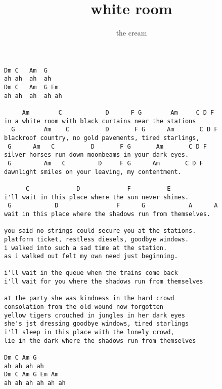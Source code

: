 \author{the cream}
\title{white room}
\maketitle
\begin{verbatim}
Dm C   Am  G
ah ah  ah  ah
Dm C   Am  G Em
ah ah  ah  ah ah

     Am        C            D      F G        Am     C D F
in a white room with black curtains near the stations
  G        Am    C          D       F G      Am       C D F
blackroof country, no gold pavements, tired starlings,
 G      Am   C          D       F G       Am       C D F
silver horses run down moonbeams in your dark eyes.
 G         Am   C         D     F G      Am       C D F
dawnlight smiles on your leaving, my contentment.

      C             D             F          E
i'll wait in this place where the sun never shines.
 G            D                F      G            A      A
wait in this place where the shadows run from themselves.

you said no strings could secure you at the stations.
platform ticket, restless diesels, goodbye windows.
i walked into such a sad time at the station.
as i walked out felt my own need just beginning.

i'll wait in the queue when the trains come back
i'll wait for you where the shadows run from themselves

at the party she was kindness in the hard crowd
consolation from the old wound now forgotten
yellow tigers crouched in jungles in her dark eyes
she's jst dressing goodbye windows, tired starlings
i'll sleep in this place with the lonely crowd,
lie in the dark where the shadows run from themselves

Dm C Am G
ah ah ah ah
Dm C Am G Em Am
ah ah ah ah ah ah
\end{verbatim}